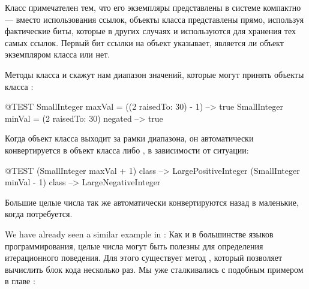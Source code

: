 \documentclass[a4paper,10pt,twoside]{book}
\begin{document}
Класс  примечателен тем, что его экземпляры представлены в системе компактно --- вместо использования ссылок, объекты класса  представлены прямо, используя фактические биты, которые в других случаях и используются для хранения тех самых ссылок.  Первый бит ссылки на объект указывает, является ли объект экземпляром класса  или нет.

Методы класса  и  скажут нам диапазон значений, которые могут принять объекты класса :

\begin{code}{@TEST}
SmallInteger maxVal = ((2 raisedTo: 30) - 1)      --> true
SmallInteger minVal = (2 raisedTo: 30) negated --> true
\end{code}

Когда объект класса  выходит за рамки диапазона, он автоматически конвертируется в объект класса  либо , в зависимости от ситуации:

\begin{code}{@TEST}
(SmallInteger maxVal + 1) class --> LargePositiveInteger
(SmallInteger minVal - 1) class  --> LargeNegativeInteger
\end{code}

Большие целые числа так же автоматически конвертируются назад в маленькие, когда потребуется.

We have already seen a similar example in :
Как и в большинстве языков программирования, целые числа могут быть полезны для определения итерационного поведения. Для этого существует метод , который позволяет вычислить блок кода несколько раз. Мы уже сталкивались с подобным примером в главе :
\end{document}
